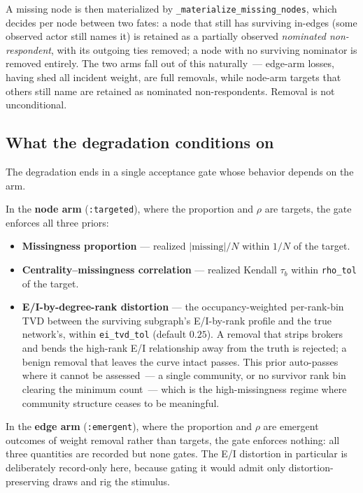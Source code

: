 \documentclass[11pt]{article}
\begin{document}
A missing node is then materialized by \texttt{\_materialize\_missing\_nodes}, which decides per node between two fates: a node that still has surviving in-edges (some observed actor still names it) is retained as a partially observed \emph{nominated non-respondent}, with its outgoing ties removed; a node with no surviving nominator is removed entirely. The two arms fall out of this naturally~--- edge-arm losses, having shed all incident weight, are full removals, while node-arm targets that others still name are retained as nominated non-respondents. Removal is not unconditional.

\subsection{What the degradation conditions on}

The degradation ends in a single acceptance gate whose behavior depends on the arm.

In the \textbf{node arm} (\texttt{:targeted}), where the proportion and $\rho$ are targets, the gate enforces all three priors:
\begin{itemize}[leftmargin=*, itemsep=3pt]
  \item \textbf{Missingness proportion} --- realized $\lvert\text{missing}\rvert / N$ within $1/N$ of the target.
  \item \textbf{Centrality--missingness correlation} --- realized Kendall $\tau_b$ within \texttt{rho\_tol} of the target.
  \item \textbf{E/I-by-degree-rank distortion} --- the occupancy-weighted per-rank-bin TVD between the surviving subgraph's E/I-by-rank profile and the true network's, within \texttt{ei\_tvd\_tol} (default $0.25$). A removal that strips brokers and bends the high-rank E/I relationship away from the truth is rejected; a benign removal that leaves the curve intact passes. This prior auto-passes where it cannot be assessed~--- a single community, or no survivor rank bin clearing the minimum count~--- which is the high-missingness regime where community structure ceases to be meaningful.
\end{itemize}

In the \textbf{edge arm} (\texttt{:emergent}), where the proportion and $\rho$ are emergent outcomes of weight removal rather than targets, the gate enforces nothing: all three quantities are recorded but none gates. The E/I distortion in particular is deliberately record-only here, because gating it would admit only distortion-preserving draws and rig the stimulus.
\end{document}
